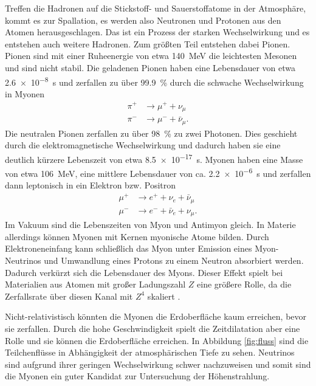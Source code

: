 Treffen die Hadronen auf die Stickstoff- und Sauerstoffatome in der Atmosphäre, kommt es zur Spallation, es werden also Neutronen und Protonen aus den Atomen herausgeschlagen. Das ist ein Prozess der starken Wechselwirkung und es entstehen auch weitere Hadronen. Zum größten Teil entstehen dabei Pionen. Pionen\cite{pdg} sind mit einer Ruheenergie von etwa \SI{140}{\mega \electronvolt} die leichtesten Mesonen und sind nicht stabil. Die geladenen Pionen haben eine Lebensdauer von etwa \SI{2.6e-8}{\second} und zerfallen zu über \SI{99.9}{\percent} durch die schwache Wechselwirkung in Myonen
\begin{align*}
  \pi^+ &\rightarrow \mu^+ + \nu_\mu\\
  \pi^- &\rightarrow \mu^- + \bar{\nu}_\mu.
\end{align*}
Die neutralen Pionen zerfallen zu über \SI{98}{\percent} zu zwei Photonen. Dies geschieht durch die elektromagnetische Wechselwirkung und dadurch haben sie eine deutlich kürzere Lebenszeit von etwa \SI{8.5e-17}{\second}.
Myonen\cite{pdg} haben eine Masse von etwa \SI{106}{\mega\electronvolt}, eine mittlere Lebensdauer von ca. \SI{2.2e-6}{\second} und zerfallen dann leptonisch in ein Elektron bzw. Positron
\begin{align*}
  \mu^+ &\rightarrow e^++ \nu_e +\bar{\nu}_\mu\\
  \mu^- &\rightarrow e^-+ \bar{\nu}_e +\nu_\mu.
\end{align*}
Im Vakuum sind die Lebenszeiten von Myon und Antimyon gleich. In Materie allerdings können Myonen mit Kernen myonische Atome bilden. Durch Elektroneneinfang kann schließlich das Myon unter Emission eines Myon-Neutrinos und Umwandlung eines Protons zu einem Neutron absorbiert werden. Dadurch verkürzt sich die Lebensdauer des Myons. Dieser Effekt spielt bei Materialien aus Atomen mit großer Ladungszahl $Z$ eine größere Rolle, da die Zerfallsrate über diesen Kanal mit $Z^4$ skaliert \cite{myonkanal}. 

Nicht-relativistisch könnten die Myonen die Erdoberfläche kaum erreichen, bevor sie zerfallen. Durch die hohe Geschwindigkeit spielt die Zeitdilatation aber eine Rolle und sie können die Erdoberfläche erreichen. In Abbildung \ref{fig:fluss} sind die Teilchenflüsse in Abhängigkeit der atmosphärischen Tiefe zu sehen. Neutrinos sind aufgrund ihrer geringen Wechselwirkung schwer nachzuweisen und somit sind die Myonen ein guter Kandidat zur Untersuchung der Höhenstrahlung.   

